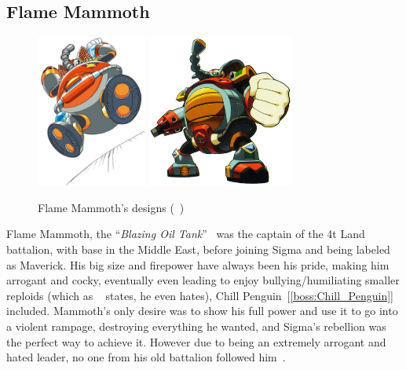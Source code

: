 \subsection{Flame Mammoth}\label{boss:Flame_mammoth}
\begin{figure}[htp]
	\centering
	\includegraphics[height=5cm]{figures/X1/Flame_mammoth/Flame_mammoth.jpg}
	\includegraphics[height=5cm]{figures/X1/Flame_mammoth/MHXFlameMammoth.jpg}
	\caption{Flame Mammoth's designs (~\cite{book:MMX_Complete_art})}
\end{figure}
Flame Mammoth, the ``\textit{Blazing Oil Tank}''~\cite{book:MMX_Complete_art} was the captain of the 4t Land battalion, with base in the Middle East, before joining Sigma and being labeled as Maverick. His big size and firepower have always been his pride, making him arrogant and cocky, eventually even leading to enjoy bullying/humiliating smaller reploids (which as ~\cite{wayback:X_resources} states, he even hates), Chill Penguin~[\ref{boss:Chill_Penguin}]~\cite{wiki:Flame_mammoth} included. Mammoth's only desire was to show his full power and use it to go into a violent rampage, destroying everything he wanted, and Sigma's rebellion was the perfect way to achieve it. However due to being an extremely arrogant and hated leader, no one from his old battalion followed him~\cite{MHX:manual}.

